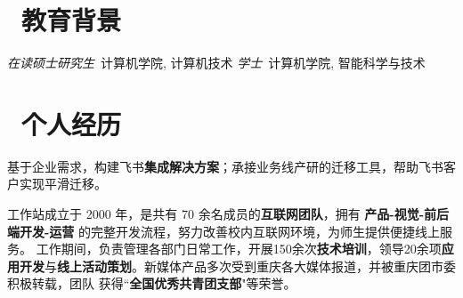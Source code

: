 \documentclass{resume}
\begin{document}



\section{\faGraduationCap\  教育背景}
  \textit{在读硕士研究生}\ 计算机学院, 计算机技术
  \textit{学士}\ 计算机学院, 智能科学与技术


\section{\faCogs\ 个人经历}

  \begin{onehalfspacing}
  基于企业需求，构建飞书\textbf{集成解决方案}；承接业务线产研的迁移工具，帮助飞书客户实现平滑迁移。
  \end{onehalfspacing}

  \begin{onehalfspacing}
    工作站成立于 2000 年，是共有 70 余名成员的\textbf{互联网团队}，拥有 \textbf{产品-视觉-前后端开发-运营} 的完整开发流程，努力改善校内互联网环境，为师生提供便捷线上服务。
    工作期间，负责管理各部门日常工作，开展150余次\textbf{技术培训}，领导20余项\textbf{应用开发}与\textbf{线上活动策划}。新媒体产品多次受到重庆各大媒体报道，并被重庆团市委积极转载，团队
    获得``\textbf{全国优秀共青团支部}"等荣誉。
  \end{onehalfspacing}

\end{document}
